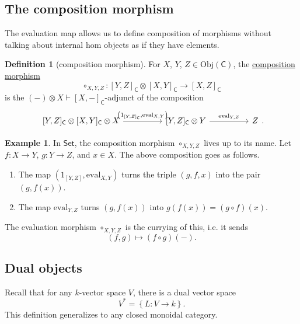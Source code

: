 \documentclass[a4paper]{report}
\newcommand{\defn}[1]{\ul{#1}}
\newcommand{\Obj}{\mathrm{Obj}}
\newcommand{\ev}{\mathrm{eval}}
\theoremstyle{definition}
\newtheorem{definition}{Definition}[section]
\newtheorem{example}{Example}[section]
\theoremstyle{plain}
\theoremstyle{remark}
\begin{document}
\subsection{The composition morphism}
The evaluation map allows us to define composition of morphisms without talking about internal hom objects as if they have elements. 
\begin{definition}[composition morphism]
  \label{def:compositionmorphism}
  For $X$, $Y$, $Z \in \Obj(\mathsf{C})$, the \defn{composition morphism}
  \begin{equation*}
    \circ_{X, Y, Z}\colon [Y, Z]_{\mathsf{C}} \otimes [X, Y]_{\mathsf{C}} \to [X, Z]_{\mathsf{C}}
  \end{equation*}
  is the $(-) \otimes X \vdash [X, -]_{\mathsf{C}}$-adjunct of the composition
  \begin{equation*}
    \begin{tikzcd}[column sep=huge]
      {[Y, Z]_{\mathsf{C}}} \otimes {[X, Y]_{\mathsf{C}}} \otimes X 
      \arrow[r, "{\left(1_{[Y, Z]_{\mathsf{C}}}, \ev_{X, Y}\right)}"]
      & {[Y, Z]_{\mathsf{C}}} \otimes Y
      \arrow[r, "{\ev_{Y, Z}}"]
      & Z
    \end{tikzcd}.
  \end{equation*}
\end{definition}

\begin{example}
  In $\mathsf{Set}$, the composition morphism $\circ_{X, Y, Z}$ lives up to its name. Let $f\colon X \to Y$, $g\colon Y \to Z$, and $x \in X$. The above composition goes as follows.
  \begin{enumerate}
    \item The map $\left( 1_{[Y, Z]}, \ev_{X, Y} \right)$ turns the triple $(g, f, x)$ into the pair $(g, f(x))$.

    \item The map $\ev_{Y, Z}$ turns $(g, f(x))$ into $g(f(x)) = (g \circ f)(x)$.
  \end{enumerate}

  The evaluation morphism $\circ_{X, Y, Z}$ is the currying of this, i.e. it sends
  \begin{equation*}
    (f, g) \mapsto (f \circ g)(-).
  \end{equation*}
\end{example}

\subsection{Dual objects}
Recall that for any $k$-vector space $V$, there is a dual vector space 
\begin{equation*}
  V^{*} = \left\{ L\colon V \to k \right\}.
\end{equation*}
This definition generalizes to any closed monoidal category.
\end{document}
